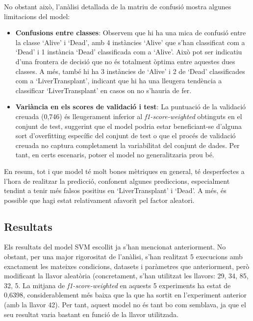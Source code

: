 No obstant això, l'anàlisi detallada de la matriu de confusió mostra algunes limitacions del model:
\begin{itemize}
	\item \textbf{Confusions entre classes}: Observem que hi ha una mica de confusió entre la classe `Alive' i `Dead', amb 4 instàncies `Alive' que s'han classificat com a `Dead' i 1 instància `Dead' classificada com a `Alive'. Això pot ser indicatiu d'una frontera de decisió que no és totalment òptima entre aquestes dues classes. A més, també hi ha 3 instàncies de `Alive' i 2 de `Dead' classificades com a `LiverTransplant', indicant que hi ha una lleugera tendència a classificar `LiverTransplant' en casos on no s'hauria de fer.
	
	\item \textbf{Variància en els scores de validació i test}: La puntuació de la validació creuada (0,746) és lleugerament inferior al \textit{f1-score-weighted} obtinguts en el conjunt de test, suggerint que el model podria estar beneficiant-se d'alguna sort d'overfitting específic del conjunt de test o que el procés de validació creuada no captura completament la variabilitat del conjunt de dades. Per tant, en certs escenaris, potser el model no generalitzaria prou bé.

\end{itemize}

En resum, tot i que model té molt bones mètriques en general, té desperfectes a l'hora de realitzar la predicció, confonent algunes prediccions, especialment tendint a tenir més falsos positius en `LiverTransplant' i `Dead'. A més, és possible que hagi estat relativament afavorit pel factor aleatori.

\subsection{Resultats}
Els resultats del model SVM escollit ja s'han mencionat anteriorment. No obstant, per una major rigorositat de l'anàlisi, s'han realitzat 5 execucions amb exactament les mateixes condicions, datasets i paràmetres que anteriorment, però modificant la llavor aleatòria (concretament, s'han utilitzat les llavors: 29, 34, 85, 32, 5. La mitjana de \textit{f1-score-weighted} en aquests 5 experiments ha estat de 0,6398, considerablement més baixa que la que ha sortit en l'experiment anterior (amb la llavor 42). Per tant, aquest model no és tant bo com semblava, ja que el seu resultat varia bastant en funció de la llavor utilitzada.


